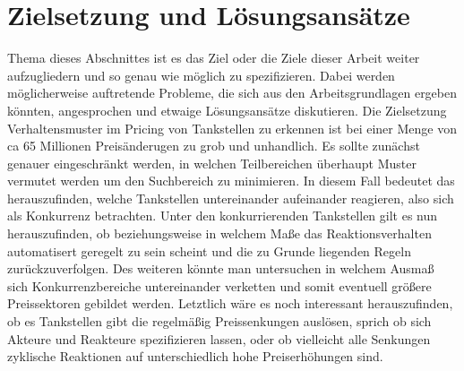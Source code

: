\documentclass[12pt,a4paper,bibliography=totocnumbered,listof=totocnumbered]{scrartcl}
\begin{document}

\vspace{-1,2em}
\newpage

\section{Zielsetzung und Lösungsansätze}
Thema dieses Abschnittes ist es das Ziel oder die Ziele dieser Arbeit weiter aufzugliedern und so genau wie möglich zu spezifizieren. Dabei werden möglicherweise auftretende Probleme, die sich aus den Arbeitsgrundlagen ergeben könnten, angesprochen und etwaige Lösungsansätze diskutieren. Die Zielsetzung Verhaltensmuster im Pricing von Tankstellen zu erkennen ist bei einer Menge von ca 65 Millionen Preisänderugen zu grob und unhandlich. Es sollte zunächst genauer eingeschränkt werden, in welchen Teilbereichen überhaupt Muster vermutet werden um den Suchbereich zu minimieren. In diesem Fall bedeutet das herauszufinden, welche Tankstellen untereinander aufeinander reagieren, also sich als Konkurrenz betrachten. Unter den konkurrierenden Tankstellen gilt es nun herauszufinden, ob beziehungsweise in welchem Maße das Reaktionsverhalten automatisert geregelt zu sein scheint und die zu Grunde liegenden Regeln zurückzuverfolgen. Des weiteren könnte man untersuchen in welchem Ausmaß sich Konkurrenzbereiche  untereinander verketten und somit eventuell größere Preissektoren gebildet werden. Letztlich wäre es noch interessant herauszufinden, ob es Tankstellen gibt die regelmäßig Preissenkungen auslösen, sprich ob sich Akteure und Reakteure spezifizieren lassen, oder ob vielleicht alle Senkungen zyklische Reaktionen auf unterschiedlich hohe Preiserhöhungen sind.

\end{document}
